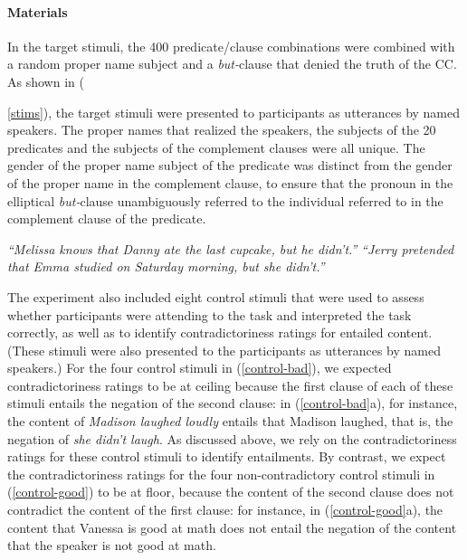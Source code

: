 \documentclass[11pt,fleqn]{article}
\newcommand{\6}{\mbox{$[\hspace*{-.6mm}[$}}
\newcommand{\9}{\mbox{$]\hspace*{-.6mm}]$}}
\begin{document}
\paragraph{Materials} In the target stimuli, the 400 predicate/clause combinations were combined with a random proper name subject and a {\em but-}clause that denied the truth of the CC. As shown in ({\ref{stims}), the target stimuli were presented to participants as utterances by named speakers. The proper names that realized the speakers, the subjects of the 20 predicates and the subjects of the complement clauses were all unique. The gender of the proper name subject of the predicate was distinct from the gender of the proper name in the complement clause, to ensure that the pronoun in the elliptical {\em but-}clause unambiguously referred to the individual referred to in the complement clause of the predicate.

\begin{exe}
\ex\label{stims}
\begin{xlist}
 {\em ``Melissa knows that Danny ate the last cupcake, but he didn't.''}
 {\em ``Jerry pretended that Emma studied on Saturday morning, but she didn't.''}
\end{xlist}
\end{exe}

The experiment also included eight control stimuli that were used to assess whether participants were attending to the task and interpreted the task correctly, as well as to identify contradictoriness ratings for entailed content. (These stimuli were also presented to the participants as utterances by named speakers.) For the four control stimuli in (\ref{control-bad}), we expected contradictoriness ratings to be at ceiling because the first clause of each of these stimuli entails the negation of the second clause: in (\ref{control-bad}a), for instance, the content of {\em Madison laughed loudly} entails that Madison laughed, that is, the negation of {\em she didn't laugh}. As discussed above, we rely on the contradictoriness ratings for these control stimuli to identify entailments. By contrast, we expect the contradictoriness ratings for the four non-contradictory control stimuli in (\ref{control-good}) to be at floor, because the content of the second clause does not contradict the content of the first clause: for instance, in (\ref{control-good}a), the content that Vanessa is good at math does not entail the negation of the content that the speaker is not good at math. 

}
\end{document}
